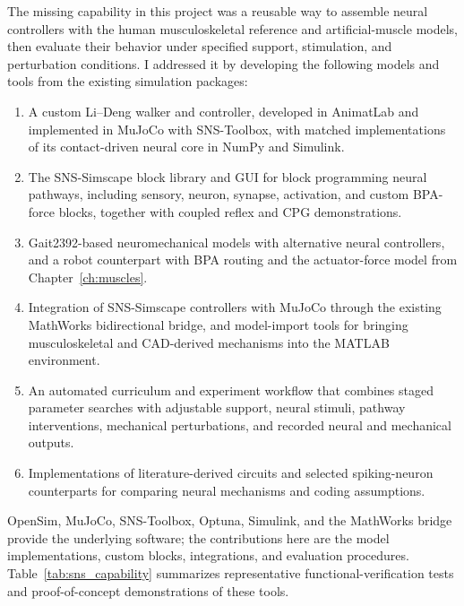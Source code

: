 The missing capability in this project was a reusable way to assemble neural controllers with the human musculoskeletal reference and artificial-muscle models, then evaluate their behavior under specified support, stimulation, and perturbation conditions. I addressed it by developing the following models and tools from the existing simulation packages:
\begin{enumerate}
    \item A custom Li--Deng walker and controller, developed in AnimatLab and implemented in MuJoCo with SNS-Toolbox, with matched implementations of its contact-driven neural core in NumPy and Simulink.
    \item The SNS-Simscape block library and GUI for block programming neural pathways, including sensory, neuron, synapse, activation, and custom BPA-force blocks, together with coupled reflex and CPG demonstrations.
    \item Gait2392-based neuromechanical models with alternative neural controllers, and a robot counterpart with BPA routing and the actuator-force model from Chapter~\ref{ch:muscles}.
    \item Integration of SNS-Simscape controllers with MuJoCo through the existing MathWorks bidirectional bridge, and model-import tools for bringing musculoskeletal and CAD-derived mechanisms into the MATLAB environment.
    \item An automated curriculum and experiment workflow that combines staged parameter searches with adjustable support, neural stimuli, pathway interventions, mechanical perturbations, and recorded neural and mechanical outputs.
    \item Implementations of literature-derived circuits and selected spiking-neuron counterparts for comparing neural mechanisms and coding assumptions.
\end{enumerate}
OpenSim, MuJoCo, SNS-Toolbox, Optuna, Simulink, and the MathWorks bridge provide the underlying software; the contributions here are the model implementations, custom blocks, integrations, and evaluation procedures. Table~\ref{tab:sns_capability} summarizes representative functional-verification tests and proof-of-concept demonstrations of these tools.
